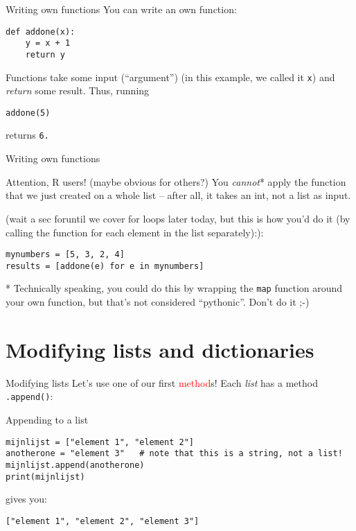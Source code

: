 \begin{frame}[fragile]{Writing own functions}
You can write an own function:
\begin{verbatim}
def addone(x):
    y = x + 1
    return y
\end{verbatim}

Functions take some input (``argument'') (in this example, we called it \texttt{x}) and \emph{return} some result.
Thus, running
\begin{verbatim}	
addone(5)
\end{verbatim}
returns \tt{6}.
\end{frame}



\begin{frame}[fragile]{Writing own functions}

\begin{alertblock}{Attention, R users! (maybe obvious for others?)}
	You \emph{cannot}* apply the function that we just created on a whole list -- after all, it takes an int, not a list as input.
\end{alertblock}

(wait a sec foruntil we cover for loops later today, but this is how you'd do it (by calling the function for each element in the list separately):):

\begin{verbatim}
mynumbers = [5, 3, 2, 4]
results = [addone(e) for e in mynumbers]
\end{verbatim}

\vspace{1cm}
\tiny{* Technically speaking, you could do this by wrapping the \texttt{map} function around your own function, but that's not considered ``pythonic''. Don't do it ;-) \\}
\end{frame}




\section[Modifying lists \& dicts]{Modifying lists and dictionaries}
\begin{frame}[fragile]{Modifying lists}
	Let's use one of our first \textcolor{red}{method}s! Each \emph{list} has a method \texttt{.append()}:
\begin{block}{Appending to a list}
\begin{verbatim}
mijnlijst = ["element 1", "element 2"]
anotherone = "element 3"   # note that this is a string, not a list!
mijnlijst.append(anotherone)
print(mijnlijst)
\end{verbatim}
gives you:
\begin{verbatim}
["element 1", "element 2", "element 3"]
\end{verbatim}
\end{block}
\end{frame}



